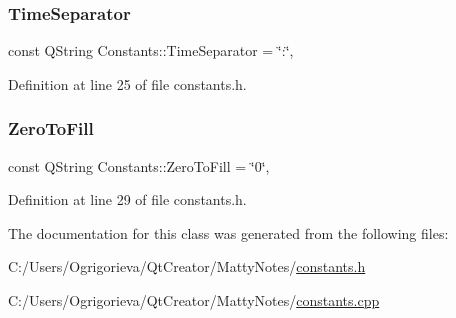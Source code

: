 \subsubsection{\texorpdfstring{Time\+Separator}{TimeSeparator}}
{\footnotesize\ttfamily const Q\+String Constants\+::\+Time\+Separator = \char`\"{}\+:\char`\"{}\hspace{0.3cm}{\ttfamily [static]}, {\ttfamily [private]}}



Definition at line 25 of file constants.\+h.

\hypertarget{classConstants_ace4bddf4b2dc0e05c8fec643238531a9}{}\label{classConstants_ace4bddf4b2dc0e05c8fec643238531a9} 
\subsubsection{\texorpdfstring{Zero\+To\+Fill}{ZeroToFill}}
{\footnotesize\ttfamily const Q\+String Constants\+::\+Zero\+To\+Fill = \char`\"{}0\char`\"{}\hspace{0.3cm}{\ttfamily [static]}, {\ttfamily [private]}}



Definition at line 29 of file constants.\+h.



The documentation for this class was generated from the following files\+:\begin{DoxyCompactItemize}
\item 
C\+:/\+Users/\+Ogrigorieva/\+Qt\+Creator/\+Matty\+Notes/\hyperlink{constants_8h}{constants.\+h}\item 
C\+:/\+Users/\+Ogrigorieva/\+Qt\+Creator/\+Matty\+Notes/\hyperlink{constants_8cpp}{constants.\+cpp}\end{DoxyCompactItemize}

